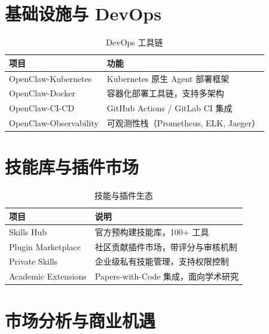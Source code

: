 \documentclass[
  customlatinfont = macos,
]{hkustthesis}
\begin{document}
\section{基础设施与 DevOps}

\begin{table}[htbp]
\centering
\caption{DevOps 工具链}
\label{tab:devops}
\begin{tabular}{@{}lp{8cm}@{}}
\toprule
\textbf{项目} & \textbf{功能} \\
\midrule
OpenClaw-Kubernetes    & Kubernetes 原生 Agent 部署框架         \\
OpenClaw-Docker        & 容器化部署工具链，支持多架构           \\
OpenClaw-CI-CD         & GitHub Actions / GitLab CI 集成        \\
OpenClaw-Observability & 可观测性栈（Prometheus, ELK, Jaeger）  \\
\bottomrule
\end{tabular}
\end{table}


\section{技能库与插件市场}

\begin{table}[htbp]
\centering
\caption{技能与插件生态}
\label{tab:skills}
\begin{tabular}{@{}lp{8cm}@{}}
\toprule
\textbf{项目} & \textbf{说明} \\
\midrule
Skills Hub         & 官方预构建技能库，100+ 工具                  \\
Plugin Marketplace & 社区贡献插件市场，带评分与审核机制            \\
Private Skills     & 企业级私有技能管理，支持权限控制              \\
Academic Extensions & Papers-with-Code 集成，面向学术研究          \\
\bottomrule
\end{tabular}
\end{table}


\section{市场分析与商业机遇}
\end{document}
